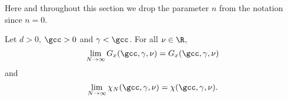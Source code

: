 Here and throughout this section we drop the parameter $n$
from the notation since $n = 0$.

\begin{prop}
\label{prop:finvol-re}
Let $d >0$, $\gcc >0$ and $\gamma < \gcc$. For all $\nu \in \R$,
\begin{equation}
\label{e:Givlc-re}
\lim_{N \to \infty}
G_x(\gcc,\gamma,\nu)
=
G_x(\gcc,\gamma,\nu)
\end{equation}
and
\begin{equation}
\label{e:chilim-re}
\lim_{N\to\infty}\chi_N(\gcc,\gamma,\nu)=   \chi(\gcc,\gamma,\nu).
\end{equation}
\end{prop}

